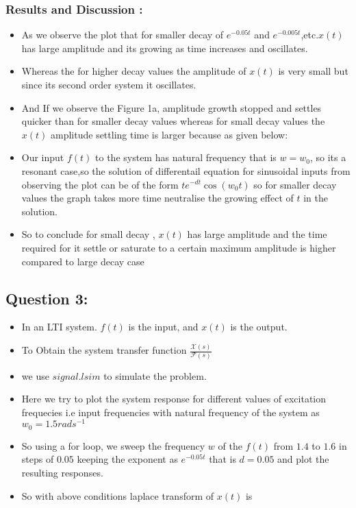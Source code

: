 \documentclass[10pt,a4paper]{article}
\begin{document}
    \subsubsection{Results and Discussion :}\label{results-and-discussion}

\begin{itemize}
\item
  As we observe the plot that for smaller decay of \(e^{-0.05t}\) and
  \(e^{-0.005t}\),etc.\(x(t)\) has large amplitude and its growing as
  time increases and oscillates.
\item
  Whereas the for higher decay values the amplitude of \(x(t)\) is very
  small but since its second order system it oscillates.
\item
  And If we observe the Figure 1a, amplitude growth stopped and settles
  quicker than for smaller decay values whereas for small decay values
  the \(x(t)\) amplitude settling time is larger because as given below:
\item
  Our input \(f(t)\) to the system has natural frequency that is
  \(w=w_0\), so its a resonant case,so the solution of differentail
  equation for sinusoidal inputs from observing the plot can be of the
  form \(te^{-dt}\cos (w_0 t)\) so for smaller decay values the graph
  takes more time neutralise the growing effect of \(t\) in the
  solution.
\item
  So to conclude for small decay , \(x(t)\) has large amplitude and the
  time required for it settle or saturate to a certain maximum amplitude
  is higher compared to large decay case
\end{itemize}

    \subsection{Question 3:}\label{question-3}

\begin{itemize}
\item
  In an LTI system. \(f(t)\) is the input, and \(x(t)\) is the output.
\item
  To Obtain the system transfer function
  \(\frac{\mathcal {X}(s)}{ \mathcal {F}(s)}\)
\item
  we use \(signal.lsim\) to simulate the problem.
\item
  Here we try to plot the system response for different values of
  excitation frequecies i.e input frequencies with natural frequency of
  the system as \(w_0 = 1.5 rads^{-1}\)
\item
  So using a for loop, we sweep the frequency \(w\) of the \(f(t)\) from
  \(1.4\) to \(1.6\) in steps of \(0.05\) keeping the exponent as
  \(e^{−0.05t}\) that is \(d=0.05\) and plot the resulting responses.
\item
  So with above conditions laplace transform of \(x(t)\) is
\end{itemize}
\end{document}
